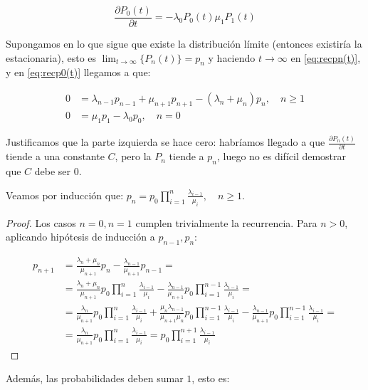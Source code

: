 \documentclass[a4paper,10pt]{scrartcl}
\theoremstyle{definition}
\theoremstyle{definition}
\numberwithin{equation}{section}
\begin{document}
	\begin{equation}
	\frac{\partial P_0(t)}{\partial t} = -\lambda_0 P_0(t) \mu_{1}P_{1}(t)
	\label{eq:recp0(t)}
	\end{equation}
	
	
	Supongamos en lo que sigue que existe la distribución límite (entonces existiría la estacionaria), esto es 
	$\lim_{t\rightarrow \infty}\{P_n(t)\} = p_n$ y haciendo $t\rightarrow \infty$ en \eqref{eq:recpn(t)},
	y en \eqref{eq:recp0(t)} llegamos a que:
	
	\begin{align*}
	0 &= \lambda_{n-1} p_{n-1} + \mu_{n+1} p_{n+1} - (\lambda_n + \mu_n) p_n, \quad n\ge 1\\
	0 &= \mu_1 p_1 -\lambda_0 p_0, \quad n=0
	\end{align*}
	
	Justificamos que la parte izquierda se hace cero: habríamos llegado a que $\frac{\partial P_n(t)}{\partial t}$ tiende a una constante $C$,
	pero la $P_n$ tiende a $p_n$, luego no es difícil demostrar que $C$ debe ser 0.
	
	Veamos por inducción que: $p_n = p_0 \prod_{i=1}^n \frac{\lambda_{i-1}}{\mu_i}, \quad n\ge 1 \label{p_n=p_0*}$.
	
	\begin{proof}
		Los casos $n=0, n=1$ cumplen trivialmente la recurrencia. Para $n>0$, aplicando hipótesis de inducción a $p_{n-1}, p_{n}$:
		
		\begin{align*}
		p_{n+1} &= \frac{\lambda_n + \mu_n}{\mu_{n+1}} p_n - \frac{\lambda_{n-1}}{\mu_{n+1}}p_{n-1} = \\
		&= \frac{\lambda_n + \mu_n}{\mu_{n+1}} p_0 \prod_{i=1}^n \frac{\lambda_{i-1}}{\mu_i} - 
		\frac{\lambda_{n-1}}{\mu_{n+1}} p_0 \prod_{i=1}^{n-1} \frac{\lambda_{i-1}}{\mu_i} = \\
		&= \frac{\lambda_n}{\mu_{n+1}} p_0 \prod_{i=1}^n \frac{\lambda_{i-1}}{\mu_i} + 
		\frac{\mu_n \lambda_{n-1}}{\mu_{n+1}\mu_n} p_0 \prod_{i=1}^{n-1} \frac{\lambda_{i-1}}{\mu_i} - 
		\frac{\lambda_{n-1}}{\mu_{n+1}} p_0 \prod_{i=1}^{n-1} \frac{\lambda_{i-1}}{\mu_i} = \\
		&= \frac{\lambda_n}{\mu_{n+1}} p_0 \prod_{i=1}^n \frac{\lambda_{i-1}}{\mu_i} = p_0 \prod_{i=1}^{n+1} \frac{\lambda_{i-1}}{\mu_i}
		\end{align*}
	\end{proof}
	
	Además, las probabilidades deben sumar $1$, esto es:
	
\end{document}
